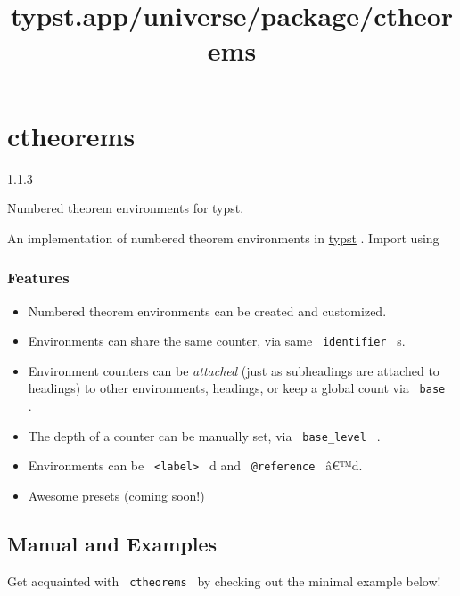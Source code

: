 \title{typst.app/universe/package/ctheorems}

\label{banner}
\section{ctheorems}\label{ctheorems}

{ 1.1.3 }

Numbered theorem environments for typst.

\label{readme}
An implementation of numbered theorem environments in
\href{https://github.com/typst/typst}{typst} . Import using

\begin{Shaded}
\begin{Highlighting}[]
\end{Highlighting}
\end{Shaded}

\subsubsection{Features}\label{features}

\begin{itemize}
\tightlist
\item
  Numbered theorem environments can be created and customized.
\item
  Environments can share the same counter, via same
  \texttt{\ identifier\ } s.
\item
  Environment counters can be \emph{attached} (just as subheadings are
  attached to headings) to other environments, headings, or keep a
  global count via \texttt{\ base\ } .
\item
  The depth of a counter can be manually set, via
  \texttt{\ base\_level\ } .
\item
  Environments can be \texttt{\ \textless{}label\textgreater{}\ }
  \textquotesingle d and \texttt{\ @reference\ } â€™d.
\item
  Awesome presets (coming soon!)
\end{itemize}

\subsection{Manual and Examples}\label{manual-and-examples}

Get acquainted with \texttt{\ ctheorems\ } by checking out the minimal
example below!

